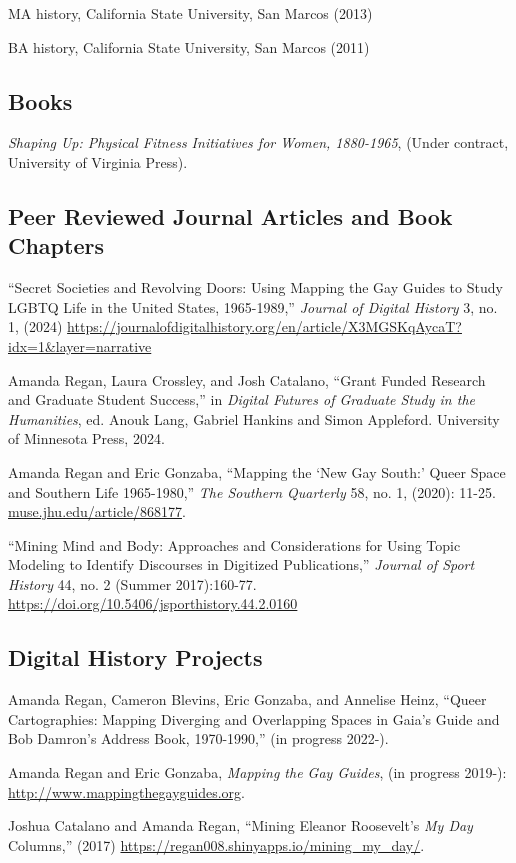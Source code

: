 \documentclass[11pt]{article}
\begin{document}
MA history, California State University, San Marcos (2013)

BA history, California State University, San Marcos (2011)

\subsection{Books}
\emph{Shaping Up: Physical Fitness Initiatives for Women, 1880-1965}, (Under contract, University of Virginia Press).

\subsection{Peer Reviewed Journal Articles and Book Chapters}\label{peer-reviewed}
``Secret Societies and Revolving Doors: Using Mapping the Gay Guides to Study LGBTQ Life in the United States, 1965-1989,'' \emph{Journal of Digital History} 3, no. 1, (2024) \url{https://journalofdigitalhistory.org/en/article/X3MGSKqAycaT?idx=1&layer=narrative}

Amanda Regan, Laura Crossley, and Josh Catalano, ``Grant Funded Research and Graduate Student Success,'' in \emph{Digital Futures of Graduate Study in the Humanities}, ed. Anouk Lang, Gabriel Hankins and Simon Appleford. University of Minnesota Press, 2024.

Amanda Regan and Eric Gonzaba, ``Mapping the `New Gay South:' Queer Space and Southern Life 1965-1980,'' \emph{The Southern Quarterly} 58, no. 1, (2020): 11-25. \url{muse.jhu.edu/article/868177}.

``Mining Mind and Body: Approaches and Considerations for Using Topic Modeling to Identify Discourses in Digitized Publications,'' \emph{Journal of Sport History} 44, no. 2 (Summer 2017):160-77. \url{https://doi.org/10.5406/jsporthistory.44.2.0160}

\subsection{Digital History Projects}

Amanda Regan, Cameron Blevins, Eric Gonzaba, and Annelise Heinz, ``Queer Cartographies: Mapping Diverging and Overlapping Spaces in Gaia's Guide and Bob Damron's Address Book, 1970-1990,'' (in progress 2022-).

Amanda Regan and Eric Gonzaba, \emph{Mapping the Gay Guides}, (in progress 2019-): \url{http://www.mappingthegayguides.org}.

Joshua Catalano and Amanda Regan, ``Mining Eleanor Roosevelt's \emph{My Day} Columns,'' (2017) \url{https://regan008.shinyapps.io/mining_my_day/}.
\end{document}
